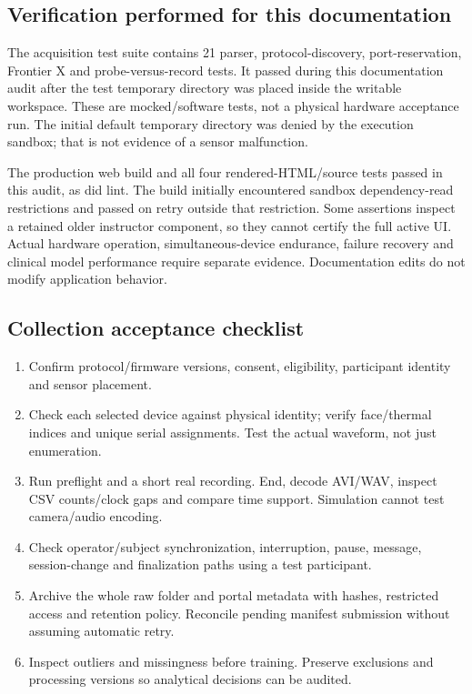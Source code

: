 \documentclass[11pt,a4paper]{article}
\begin{document}
\subsection{Verification performed for this documentation}
The acquisition test suite contains 21 parser, protocol-discovery, port-reservation, Frontier X and probe-versus-record tests. It passed during this documentation audit after the test temporary directory was placed inside the writable workspace. These are mocked/software tests, not a physical hardware acceptance run. The initial default temporary directory was denied by the execution sandbox; that is not evidence of a sensor malfunction.

The production web build and all four rendered-HTML/source tests passed in this audit, as did lint. The build initially encountered sandbox dependency-read restrictions and passed on retry outside that restriction. Some assertions inspect a retained older instructor component, so they cannot certify the full active UI. Actual hardware operation, simultaneous-device endurance, failure recovery and clinical model performance require separate evidence. Documentation edits do not modify application behavior.

\subsection{Collection acceptance checklist}
\begin{enumerate}
\item Confirm protocol/firmware versions, consent, eligibility, participant identity and sensor placement.
\item Check each selected device against physical identity; verify face/thermal indices and unique serial assignments. Test the actual waveform, not just enumeration.
\item Run preflight and a short real recording. End, decode AVI/WAV, inspect CSV counts/clock gaps and compare time support. Simulation cannot test camera/audio encoding.
\item Check operator/subject synchronization, interruption, pause, message, session-change and finalization paths using a test participant.
\item Archive the whole raw folder and portal metadata with hashes, restricted access and retention policy. Reconcile pending manifest submission without assuming automatic retry.
\item Inspect outliers and missingness before training. Preserve exclusions and processing versions so analytical decisions can be audited.
\end{enumerate}
\end{document}
